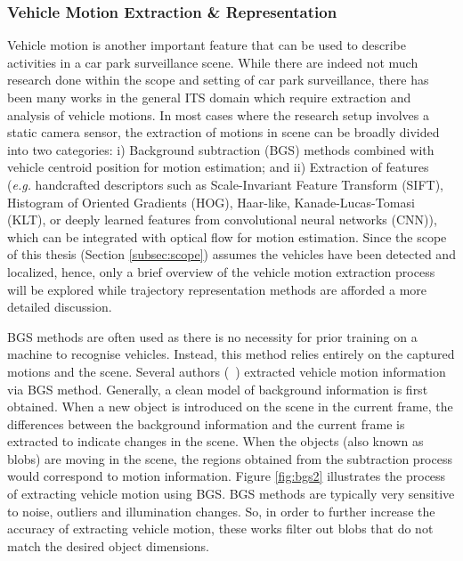 \vspace{1em}
\subsubsection{Vehicle Motion Extraction \& Representation}
\label{subsec:vehiclemotionextraction}

Vehicle motion is another important feature that can be used to describe activities in a car park surveillance scene. While there are indeed not much research done within the scope and setting of car park surveillance, there has been many works in the general ITS domain which require extraction and analysis of vehicle motions. In most cases where the research setup involves a static camera sensor, the extraction of motions in scene can be broadly divided into two categories:
i) Background subtraction (BGS) methods combined with vehicle centroid position for motion estimation; and ii) Extraction of features (\emph{e.g.} handcrafted descriptors such as Scale-Invariant Feature Transform (SIFT), Histogram of Oriented Gradients (HOG), Haar-like, Kanade-Lucas-Tomasi (KLT), or deeply learned features from convolutional neural networks (CNN)), which can be integrated with optical flow for motion estimation. 
Since the scope of this thesis (Section \ref{subsec:scope}) assumes the vehicles have been detected and localized, hence, only a brief overview of the vehicle motion extraction process will be explored while trajectory representation methods are afforded a more detailed discussion.

BGS methods are often used as there is no necessity for prior training on a machine to recognise vehicles. Instead, this method relies entirely on the captured motions and the scene. Several
authors (~)
extracted vehicle motion information via BGS method. Generally, a clean model of
background information is first obtained. When a new object is introduced on the
scene in the current frame, the differences between the background information and the current frame is extracted to indicate changes in the scene. When the objects (also known as blobs) are moving in the scene, the regions obtained from the subtraction
process would correspond to motion information. Figure \ref{fig:bgs2}
illustrates the process of extracting vehicle motion using BGS. BGS methods are typically very sensitive to noise, outliers and illumination changes. So, in order to further increase the accuracy of extracting vehicle motion, these works filter out blobs that do not match the desired object dimensions.

